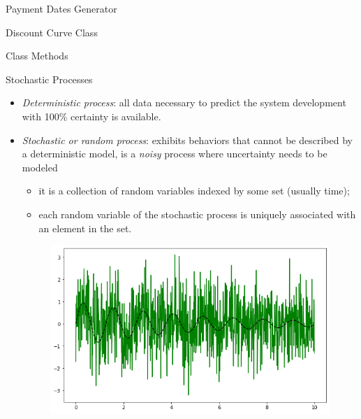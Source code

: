 \documentclass{beamer}
\begin{document}
\begin{frame}[fragile]{Payment Dates Generator}
\begin{itemize}
\begin{frame}{Discount Curve Class}
\begin{frame}{Class Methods}
\begin{itemize}
\begin{iptyhon}
\begin{frame}{Stochastic Processes}
\begin{itemize}
\item \emph{Deterministic process}: all data necessary to predict the system development with 100\% certainty is available.
\item \emph{Stochastic or random process}: exhibits behaviors that cannot be described by a deterministic model, is a \emph{noisy} process where uncertainty needs to be modeled
   \begin{itemize}
    \item it is a collection of random variables indexed by some set (usually time);
    \item each random variable of the stochastic process is uniquely associated with an element in the set. 
    \end{itemize}
\begin{figure}[h]
    \begin{center}
    \includegraphics[width=0.5\linewidth]{stochastic_process}
    \end{center}
\end{figure}        
\end{itemize}
\end{frame}


\end{iptyhon}
\end{itemize}
\end{frame}
\end{frame}
\end{itemize}
\end{frame}
\end{document}
